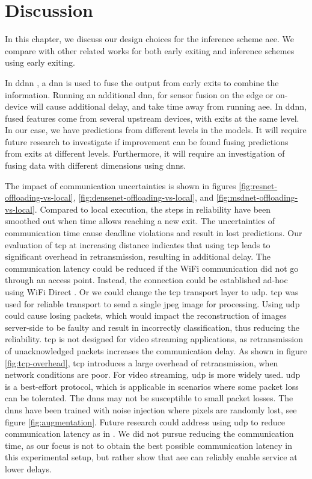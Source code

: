 \hypertarget{discussion}{%
	\chapter{Discussion}\label{ch:discussion}}

In this chapter, we discuss our design choices for the inference scheme \gls{aee}. We compare with other related works for both early exiting and inference schemes using early exiting.

In \gls{ddnn} \cite{teerapittayanon_distributed_2017}, a \gls{dnn} is used to fuse the output from early exits to combine the information. Running an additional \gls{dnn}, for sensor fusion on the edge or on-device will cause additional delay, and take time away from running \gls{aee}. In \gls{ddnn}, fused features come from several upstream devices, with exits at the same level. In our case, we have predictions from different levels in the models. It will require future research to investigate if improvement can be found fusing predictions from exits at different levels. Furthermore, it will require an investigation of fusing data with different dimensions using \gls{dnn}s. 

The impact of communication uncertainties is shown in figures \ref{fig:resnet-offloading-vs-local}, \ref{fig:densenet-offloading-vs-local}, and \ref{fig:msdnet-offloading-vs-local}. Compared to local execution, the steps in reliability have been smoothed out when time allows reaching a new exit. The uncertainties of communication time cause deadline violations and result in lost predictions. Our evaluation of \gls{tcp} at increasing distance indicates that using \gls{tcp} leads to significant overhead in retransmission, resulting in additional delay. The communication latency could be reduced if the WiFi communication did not go through an access point. Instead, the connection could be established ad-hoc using WiFi Direct \cite{noauthor_wi-fi_nodate}. Or we could change the \gls{tcp} transport layer to \gls{udp}. \gls{tcp} was used for reliable transport to send a single jpeg image for processing. Using \gls{udp} could cause losing packets, which would impact the reconstruction of images server-side to be faulty and result in incorrectly classification, thus reducing the reliability. \gls{tcp} is not designed for video streaming applications, as retransmission of unacknowledged packets increases the communication delay. As shown in figure \ref{fig:tcp-overhead}, \gls{tcp} introduces a large overhead of retransmission, when network conditions are poor. For video streaming, \gls{udp} is more widely used. \gls{udp} is a best-effort protocol, which is applicable in scenarios where some packet loss can be tolerated. The \gls{dnn}s may not be susceptible to small packet losses. The \gls{dnn}s have been trained with noise injection where pixels are randomly lost, see figure \ref{fig:augmentation}. Future research could address using \gls{udp} to reduce communication latency as in \cite{liu_maximizing_2019}. We did not pursue reducing the communication time, as our focus is not to obtain the best possible communication latency in this experimental setup, but rather show that \gls{aee} can reliably enable service at lower delays. 

